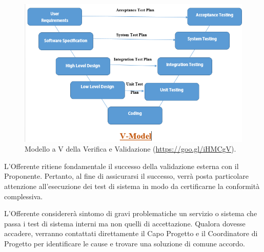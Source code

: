             \begin{figure}[H]
				\centering
				\includegraphics[scale=0.4]{immagini/rollout/v-model}
				\caption{Modello a V della Verifica e Validazione (\url{https://goo.gl/iHMCgV}).}
			\end{figure}
            L'Offerente ritiene fondamentale il successo della validazione esterna con il Proponente. Pertanto, al fine di assicurarsi il successo, verrà posta particolare attenzione all'esecuzione dei test di sistema in modo da certificarne la conformità complessiva.
            
            
            L'Offerente considererà sintomo di gravi problematiche un servizio o sistema che passa i test di sistema interni ma non quelli di accettazione. Qualora dovesse accadere, verranno contattati direttamente il Capo Progetto e il Coordinatore di Progetto per identificare le cause e trovare una soluzione di comune accordo.
            	
            
            
            
            
            
            
            
            
			
            
            
                







